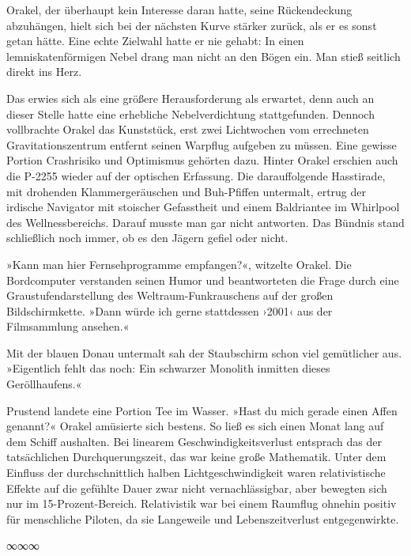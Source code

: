 Orakel, der überhaupt kein Interesse daran hatte, seine Rückendeckung abzuhängen, hielt sich bei der nächsten Kurve stärker zurück, als er es sonst getan hätte. Eine echte Zielwahl hatte er nie gehabt: In einen lemniskatenförmigen Nebel drang man nicht an den Bögen ein. Man stieß seitlich direkt ins Herz.

Das erwies sich als eine größere Herausforderung als erwartet, denn auch an dieser Stelle hatte eine erhebliche Nebelverdichtung stattgefunden. Dennoch vollbrachte Orakel das Kunststück, erst zwei Lichtwochen vom errechneten Gravitationszentrum entfernt seinen Warpflug aufgeben zu müssen. Eine gewisse Portion Crashrisiko und Optimismus gehörten dazu. Hinter Orakel erschien auch die P-2255 wieder auf der optischen Erfassung. Die darauffolgende Hasstirade, mit drohenden Klammergeräuschen und Buh-Pfiffen untermalt, ertrug der irdische Navigator mit stoischer Gefasstheit und einem Baldriantee im Whirlpool des Wellnessbereichs. Darauf musste man gar nicht antworten. Das Bündnis stand schließlich noch immer, ob es den Jägern gefiel oder nicht.

»Kann man hier Fernsehprogramme empfangen?«, witzelte Orakel. Die Bordcomputer verstanden seinen Humor und beantworteten die Frage durch eine Graustufendarstellung des Weltraum-Funkrauschens auf der großen Bildschirmkette. »Dann würde ich gerne stattdessen ›2001‹ aus der Filmsammlung ansehen.«

Mit der blauen Donau untermalt sah der Staubschirm schon viel gemütlicher aus. »Eigentlich fehlt das noch: Ein schwarzer Monolith inmitten dieses Geröllhaufens.«


Prustend landete eine Portion Tee im Wasser. »Hast du mich gerade einen Affen genannt?« Orakel amüsierte sich bestens. So ließ es sich einen Monat lang auf dem Schiff aushalten. Bei linearem Geschwindigkeitsverlust entsprach das der tatsächlichen Durchquerungszeit, das war keine große Mathematik. Unter dem Einfluss der durchschnittlich halben Lichtgeschwindigkeit waren relativistische Effekte auf die gefühlte Dauer zwar nicht vernachlässigbar, aber bewegten sich nur im 15-Prozent-Bereich. Relativistik war bei einem Raumflug ohnehin positiv für menschliche Piloten, da sie Langeweile und Lebenszeitverlust entgegenwirkte.

\begin{center}
∞∞∞
\end{center}

